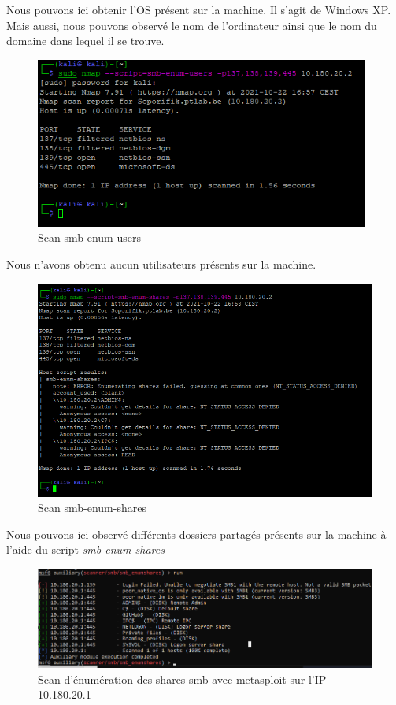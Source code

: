 \documentclass[french,paper=a4,oneside,captions=tableheading]{article}
\begin{document}
Nous pouvons ici obtenir l'OS présent sur la machine. Il s'agit de Windows XP. Mais aussi, nous pouvons observé le nom de l'ordinateur ainsi que le nom du domaine dans lequel il se trouve.

\begin{figure}[H]
    \centering
    \includegraphics[width=11cm]{images/Secu_Offensive_22.png}
    \caption{Scan smb-enum-users}
    \label{fig:smb3}
\end{figure}

Nous n'avons obtenu aucun utilisateurs présents sur la machine.

\begin{figure}[H]
    \centering
    \includegraphics[width=15cm]{images/Secu_Offensive_23.png}
    \caption{Scan smb-enum-shares}
    \label{fig:smb4}
\end{figure}

Nous pouvons ici observé différents dossiers partagés présents sur la machine à l'aide du script \textit{smb-enum-shares}

\begin{figure}[H]
    \centering
    \includegraphics[width=16cm]{images/smb-shares-enum-msf.png}
    \caption{Scan d'énumération des shares smb avec metasploit sur l'IP 10.180.20.1}
    \label{fig:smb-shares-enum-msf}
\end{figure}
\end{document}
